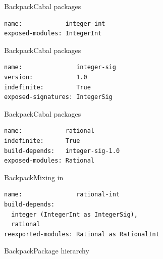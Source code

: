\documentclass{beamer}
\begin{document}
\begin{frame}[fragile]{Backpack}{Cabal packages}
\begin{lstlisting}[language=Cabal,title=Integer implementation package]
name:            integer-int
exposed-modules: IntegerInt
\end{lstlisting}
\end{frame}

\begin{frame}[fragile]{Backpack}{Cabal packages}
\begin{lstlisting}[language=Cabal,title=Integer signature package]
name:               integer-sig
version:            1.0
indefinite:         True
exposed-signatures: IntegerSig
\end{lstlisting}
\end{frame}

\begin{frame}[fragile]{Backpack}{Cabal packages}
\begin{lstlisting}[language=Cabal,title=Rational ``functor'' package]
name:            rational
indefinite:      True
build-depends:   integer-sig-1.0
exposed-modules: Rational
\end{lstlisting}
\end{frame}

\begin{frame}[fragile]{Backpack}{Mixing in}
\begin{lstlisting}[language=Cabal,title=Rationals based on Integers]
name:               rational-int
build-depends:
  integer (IntegerInt as IntegerSig),
  rational
reexported-modules: Rational as RationalInt
\end{lstlisting}
\end{frame}

\begin{frame}{Backpack}{Package hierarchy}
\end{frame}
\end{document}
